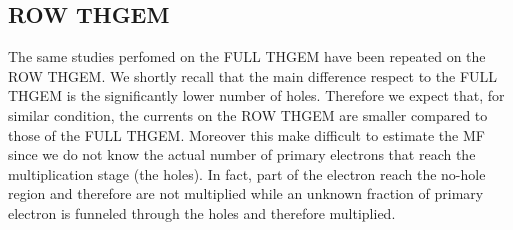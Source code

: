 \documentclass[a4paper, 11 pt]{report}
\begin{document}
\subsection{ROW THGEM}
The same studies perfomed on the FULL THGEM have been repeated on the ROW THGEM. We shortly recall 
that the main difference respect to the FULL THGEM is the significantly lower number of holes.
Therefore we expect that, for similar condition, the currents on the ROW THGEM are smaller compared 
to those of the FULL THGEM. Moreover this make difficult to estimate the MF since we do not know 
the actual number of primary electrons that reach the multiplication stage (the holes). In fact, 
part of the electron reach the no-hole region and therefore are not multiplied while an unknown 
fraction of primary electron is funneled through the holes and therefore multiplied.
\end{document}
